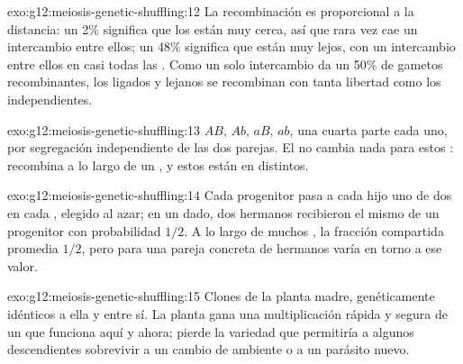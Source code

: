 \begin{solution}{exo:g12:meiosis-genetic-shuffling:12}
La recombinación es proporcional a la distancia: un 2\% significa que
los  están muy cerca, así que rara vez cae un intercambio entre
ellos; un 48\% significa que están muy lejos, con un intercambio entre
ellos en casi todas las . Como un solo intercambio da un 50\% de
gametos recombinantes, los  ligados y lejanos se recombinan con
tanta libertad como los independientes.
\end{solution}

\begin{solution}{exo:g12:meiosis-genetic-shuffling:13}
$AB$, $Ab$, $aB$, $ab$, una cuarta parte cada uno, por segregación
independiente de las dos parejas. El  no cambia nada
para estos : recombina  a lo largo de un , y estos
están en  distintos.
\end{solution}

\begin{solution}{exo:g12:meiosis-genetic-shuffling:14}
Cada progenitor pasa a cada hijo uno de dos  en cada , elegido
al azar; en un  dado, dos hermanos recibieron el mismo  de un
progenitor con probabilidad $1/2$. A lo largo de muchos , la
fracción compartida promedia $1/2$, pero para una pareja concreta de
hermanos varía en torno a ese valor.
\end{solution}

\begin{solution}{exo:g12:meiosis-genetic-shuffling:15}
Clones de la planta madre, genéticamente idénticos a ella y entre sí.
La planta gana una multiplicación rápida y segura de un  que
funciona aquí y ahora; pierde la variedad que permitiría a algunos
descendientes sobrevivir a un cambio de ambiente o a un parásito nuevo.
\end{solution}

